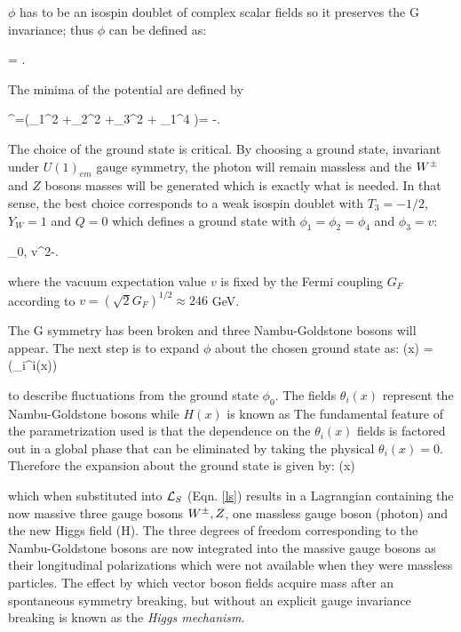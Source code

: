 \noindent $\phi$ has to be an isospin doublet of complex scalar fields so it preserves the G invariance; thus $\phi$ can be defined as:

\beqn
\phi =  \equiv {}.
\eeqn

The minima of the potential are defined by

\beqn
\phi^\dagger\phi=(\phi_1^2 +\phi_2^2 +\phi_3^2 + \phi_1^4 )= -.
\eeqn

The choice of the ground state is critical. By choosing a ground state, invariant under $U(1)_{em}$ gauge symmetry, the photon will remain massless and the $W^\pm$ and $Z$ bosons masses will be generated which is exactly what is needed. In that sense, the best choice corresponds to a weak isospin doublet with $T_3=-1/2$, $Y_W=1$ and $Q=0$ which defines a ground state with $\phi_1=\phi_2=\phi_4$ and $\phi_3=v$:

\beqn\label{field_exp}
\phi_0\equiv{}, \qquad v^2\equiv-.
\eeqn

\noindent where the vacuum expectation value $v$ is fixed by the Fermi coupling $G_F$ according to $v=(\sqrt{2}G_F)^{1/2}\approx 246$ GeV.

The G symmetry has been broken and three Nambu-Goldstone bosons will appear. The next step is to expand $\phi$ about the chosen ground state as:
\beqn
\phi(x) = \exp\left(\sigma_i\theta^i(x)\right) \approx {} 
\eeqn

\noindent to describe fluctuations from the ground state $\phi_0$. The fields $\theta_i(x)$ represent the Nambu-Goldstone bosons while $H(x)$ is known as  The fundamental feature of the parametrization used is that the dependence on the $\theta_i(x)$ fields is factored out in a global phase that can be eliminated by taking the physical  $\theta_i(x)=0$. Therefore the expansion about the ground state is given by:
\beqn\label{higgs_dublet}
\phi(x)
\eeqn

\noindent which when substituted into $\mathcal{L}_S$ (Eqn. \ref{ls}) results in a Lagrangian containing the now massive three gauge bosons $W^\pm, Z$, one massless gauge boson (photon) and the new Higgs field (H). The three degrees of freedom corresponding to the Nambu-Goldstone bosons are now integrated into the massive gauge bosons as their longitudinal polarizations which were not available when they were massless particles. The effect by which vector boson fields acquire mass after an spontaneous symmetry breaking, but without an explicit gauge invariance breaking is known as the \textit{Higgs mechanism}.

